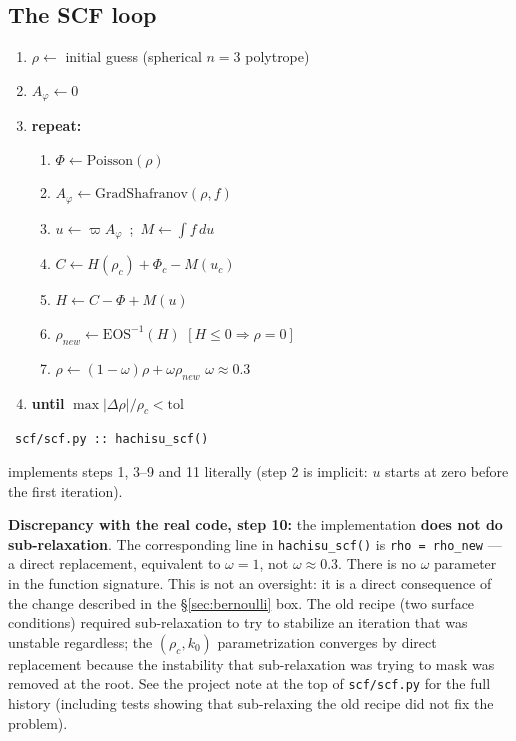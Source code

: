 \documentclass[11pt,a4paper]{scrartcl}
\newcommand{\arrowto}[1]{%
  \par\vspace{2pt}\noindent{\color{linkblue}$\rightarrow$}~\texttt{\small #1}\par\vspace{2pt}}
\newcommand{\code}[1]{\texttt{\small #1}}
\begin{document}
\subsection{The SCF loop}
\label{sec:loop}

\begin{enumerate}[leftmargin=2.6em,itemsep=0.15em,label=\arabic*.]
\item $\rho \leftarrow$ initial guess (spherical $n=3$ polytrope)
\item $A_\varphi \leftarrow 0$
\item \textbf{repeat:}
\begin{enumerate}[leftmargin=2.6em,itemsep=0.15em,label=\arabic*.,start=4]
\item $\Phi \leftarrow \mathrm{Poisson}(\rho)$
\item $A_\varphi \leftarrow \mathrm{GradShafranov}(\rho, f)$
\item $u \leftarrow \varpi A_\varphi$\ ;\ $M \leftarrow \int f\,du$
\item $C \leftarrow H(\rho_c) + \Phi_c - M(u_c)$
\item $H \leftarrow C - \Phi + M(u)$
\item $\rho_{new} \leftarrow \mathrm{EOS}^{-1}(H)$ \qquad $[H\le0 \Rightarrow \rho=0]$
\item $\rho \leftarrow (1-\omega)\rho + \omega\rho_{new}$ \qquad $\omega\approx0.3$
\end{enumerate}
\item[11.] \textbf{until} $\max|\Delta\rho|/\rho_c < \mathrm{tol}$
\end{enumerate}

\arrowto{scf/scf.py :: hachisu\_scf()} implements steps 1, 3--9 and 11 literally (step 2 is implicit: $u$ starts at zero before the first iteration).

\textbf{Discrepancy with the real code, step 10:} the implementation
\textbf{does not do sub-relaxation}. The corresponding line in
\code{hachisu\_scf()} is \code{rho = rho\_new} --- a direct replacement,
equivalent to $\omega=1$, not $\omega\approx0.3$. There is no $\omega$
parameter in the function signature. This is not an oversight: it is a
direct consequence of the change described in the \S\ref{sec:bernoulli}
box. The old recipe (two surface conditions) required sub-relaxation to
try to stabilize an iteration that was unstable regardless; the
$(\rho_c,k_0)$ parametrization converges by direct replacement because
the instability that sub-relaxation was trying to mask was removed at
the root. See the project note at the top of \code{scf/scf.py} for the
full history (including tests showing that sub-relaxing the old recipe
did not fix the problem).
\end{document}

